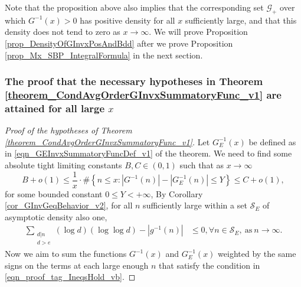 \documentclass[11pt,reqno,a4letter]{article}
\numberwithin{figure}{section}
\numberwithin{table}{section}
\theoremstyle{plain}
\numberwithin{theorem}{section}
\theoremstyle{definition}
\begin{document}
Note that the proposition above also implies that the corresponding set $\mathcal{G}_{+}$ over which 
$G^{-1}(x) > 0$ has positive density for all $x$ sufficiently large, and that this density does not 
tend to zero as $x \rightarrow \infty$. 
We will prove Proposition \ref{prop_DensityOfGInvxPosAndBdd} after we prove 
Proposition \ref{prop_Mx_SBP_IntegralFormula} in the next section. 

\subsubsection{The proof that the necessary hypotheses in Theorem \ref{theorem_CondAvgOrderGInvxSummatoryFunc_v1} are 
               attained for all large $x$} 
\label{subsubSection_PfOfNecessaryThmHyps} 

\begin{proof}[Proof of the hypotheses of Theorem \ref{theorem_CondAvgOrderGInvxSummatoryFunc_v1}]
Let $G_E^{-1}(x)$ be defined as in \eqref{eqn_GEInvxSummatoryFuncDef_v1} of the theorem. 
We need to find some absolute tight limiting constants 
$B, C \in (0, 1)$ such that as $x \rightarrow \infty$ 
\begin{equation} 
\label{eqn_proof_tag_ThmConstsBCHyp_defs_v1} 
B + o(1) \leq \frac{1}{x} \cdot \#\left\{n \leq x: |G^{-1}(n)| - |G_E^{-1}(n)| \leq Y\right\} \leq 
     C + o(1), 
\end{equation} 
for some bounded constant $0 \leq Y < +\infty$, 
By Corollary \ref{cor_GInvGeqBehavior_v2}, 
for all $n$ sufficiently large within a set $\mathcal{S}_E$ of asymptotic density also one, 
\begin{align} 
\label{eqn_proof_tag_IneqsHold_vb} 
\sum_{\substack{d|n \\ d > e}} (\log d) (\log\log d) - |g^{-1}(n)| & \leq 0, \forall n \in \mathcal{S}_E, 
     \mathrm{\ as\ } n \rightarrow \infty. 
\end{align} 
Now we aim to sum the functions $G^{-1}(x)$ and $G_E^{-1}(x)$ weighted by the same signs on the 
terms at each large enough $n$ that satisfy the condition in \eqref{eqn_proof_tag_IneqsHold_vb}. 


\end{proof}
\end{document}
